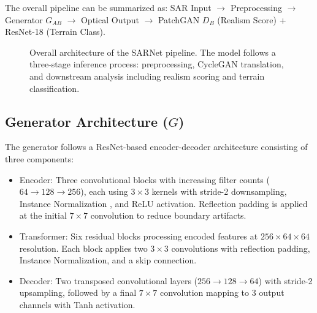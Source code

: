 \documentclass[conference]{IEEEtran}
\begin{document}
The overall pipeline can be summarized as: SAR Input $\rightarrow$ Preprocessing $\rightarrow$ Generator $G_{AB}$ $\rightarrow$ Optical Output $\rightarrow$ PatchGAN $D_B$ (Realism Score) + ResNet-18 (Terrain Class).

\begin{figure}[htbp]
\centerline{
}
\caption{Overall architecture of the SARNet pipeline. The model follows a three-stage inference process: preprocessing, CycleGAN translation, and downstream analysis including realism scoring and terrain classification.}
\label{fig:pipeline}
\end{figure}

\subsection{Generator Architecture ($G$)}

The generator follows a ResNet-based encoder-decoder architecture consisting of three components:

\begin{itemize}
    \item Encoder: Three convolutional blocks with increasing filter counts ($64 \rightarrow 128 \rightarrow 256$), each using $3 \times 3$ kernels with stride-2 downsampling, Instance Normalization \cite{ulyanov2016instance}, and ReLU activation. Reflection padding is applied at the initial $7 \times 7$ convolution to reduce boundary artifacts.
    \item Transformer: Six residual blocks \cite{he2016deep} processing encoded features at $256 \times 64 \times 64$ resolution. Each block applies two $3 \times 3$ convolutions with reflection padding, Instance Normalization, and a skip connection.
    \item Decoder: Two transposed convolutional layers ($256 \rightarrow 128 \rightarrow 64$) with stride-2 upsampling, followed by a final $7 \times 7$ convolution mapping to 3 output channels with Tanh activation.
\end{itemize}
\end{document}
